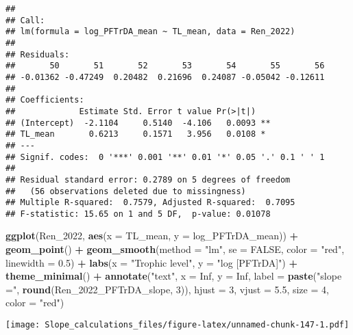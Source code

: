 \documentclass[
]{article}
\newenvironment{Shaded}{\begin{snugshade}}{\end{snugshade}}
\newcommand{\AttributeTok}[1]{\textcolor[rgb]{0.13,0.29,0.53}{#1}}
\newcommand{\ConstantTok}[1]{\textcolor[rgb]{0.56,0.35,0.01}{#1}}
\newcommand{\DecValTok}[1]{\textcolor[rgb]{0.00,0.00,0.81}{#1}}
\newcommand{\FloatTok}[1]{\textcolor[rgb]{0.00,0.00,0.81}{#1}}
\newcommand{\FunctionTok}[1]{\textcolor[rgb]{0.13,0.29,0.53}{\textbf{#1}}}
\newcommand{\NormalTok}[1]{#1}
\newcommand{\SpecialCharTok}[1]{\textcolor[rgb]{0.81,0.36,0.00}{\textbf{#1}}}
\newcommand{\StringTok}[1]{\textcolor[rgb]{0.31,0.60,0.02}{#1}}
\begin{document}
\begin{verbatim}
## 
## Call:
## lm(formula = log_PFTrDA_mean ~ TL_mean, data = Ren_2022)
## 
## Residuals:
##       50       51       52       53       54       55       56 
## -0.01362 -0.47249  0.20482  0.21696  0.24087 -0.05042 -0.12611 
## 
## Coefficients:
##             Estimate Std. Error t value Pr(>|t|)   
## (Intercept)  -2.1104     0.5140  -4.106   0.0093 **
## TL_mean       0.6213     0.1571   3.956   0.0108 * 
## ---
## Signif. codes:  0 '***' 0.001 '**' 0.01 '*' 0.05 '.' 0.1 ' ' 1
## 
## Residual standard error: 0.2789 on 5 degrees of freedom
##   (56 observations deleted due to missingness)
## Multiple R-squared:  0.7579, Adjusted R-squared:  0.7095 
## F-statistic: 15.65 on 1 and 5 DF,  p-value: 0.01078
\end{verbatim}

\begin{Shaded}
\begin{Highlighting}[]
\FunctionTok{ggplot}\NormalTok{(Ren\_2022, }\FunctionTok{aes}\NormalTok{(}\AttributeTok{x =}\NormalTok{ TL\_mean, }\AttributeTok{y =}\NormalTok{ log\_PFTrDA\_mean)) }\SpecialCharTok{+}
  \FunctionTok{geom\_point}\NormalTok{() }\SpecialCharTok{+}
  \FunctionTok{geom\_smooth}\NormalTok{(}\AttributeTok{method =} \StringTok{"lm"}\NormalTok{, }\AttributeTok{se =} \ConstantTok{FALSE}\NormalTok{, }\AttributeTok{color =} \StringTok{"red"}\NormalTok{, }\AttributeTok{linewidth =} \FloatTok{0.5}\NormalTok{) }\SpecialCharTok{+}
  \FunctionTok{labs}\NormalTok{(}\AttributeTok{x =} \StringTok{"Trophic level"}\NormalTok{,}
       \AttributeTok{y =} \StringTok{"log [PFTrDA]"}\NormalTok{) }\SpecialCharTok{+}
  \FunctionTok{theme\_minimal}\NormalTok{() }\SpecialCharTok{+}
  \FunctionTok{annotate}\NormalTok{(}\StringTok{"text"}\NormalTok{, }\AttributeTok{x =} \ConstantTok{Inf}\NormalTok{, }\AttributeTok{y =} \ConstantTok{Inf}\NormalTok{, }\AttributeTok{label =} \FunctionTok{paste}\NormalTok{(}\StringTok{"slope ="}\NormalTok{, }\FunctionTok{round}\NormalTok{(Ren\_2022\_PFTrDA\_slope, }\DecValTok{3}\NormalTok{)), }
           \AttributeTok{hjust =} \DecValTok{3}\NormalTok{, }\AttributeTok{vjust =} \FloatTok{5.5}\NormalTok{, }\AttributeTok{size =} \DecValTok{4}\NormalTok{, }\AttributeTok{color =} \StringTok{"red"}\NormalTok{)}
\end{Highlighting}
\end{Shaded}

\texttt{[image: Slope\_calculations\_files/figure-latex/unnamed-chunk-147-1.pdf]}
\end{document}
